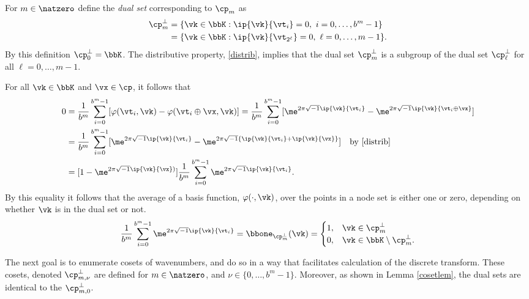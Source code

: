 \documentclass[]{elsarticle}
\theoremstyle{definition}
\begin{document}
For $m \in \natzero$ define the \emph{dual set} corresponding to $\cp_m$ as  
\begin{align*}
\cp^{\perp}_m &= \{\vk \in \bbK : \ip{\vk}{\vt_i} = 0, \ i=0, \ldots, b^m-1\} \\
&= \{\vk \in \bbK : \ip{\vk}{\vt_{2^{\ell}}} = 0, \ \ell=0, \ldots, m-1\}.
\end{align*}
By this definition $\cp^{\perp}_{0}=\bbK$.  The distributive property, \eqref{distrib}, implies that the dual set $\cp^{\perp}_m$ is a subgroup of the dual set $\cp^{\perp}_\ell$ for all $\ell=0, \ldots, m-1$.  

For all $\vk \in \bbK$ and $\vx \in \cp$, it follows that
\begin{align*} 
\nonumber
0 & = \frac{1}{b^m} \sum_{i=0}^{b^m-1} [\varphi(\vt_i,\vk) - \varphi(\vt_i \oplus \vx,\vk)]  
= \frac{1}{b^m} \sum_{i=0}^{b^m-1} [\me^{2 \pi \sqrt{-1} \ip{\vk}{\vt_i}} - \me^{2 \pi \sqrt{-1} \ip{\vk}{\vt_i \oplus \vx}}]\\
\nonumber
& = \frac{1}{b^m} \sum_{i=0}^{b^m-1} [\me^{2 \pi \sqrt{-1} \ip{\vk}{\vt_i}} - \me^{2 \pi \sqrt{-1} \{\ip{\vk}{\vt_i}+\ip{\vk}{\vx}\}}] \quad \text{by } \eqref{distrib}\\
\label{sumeq}
& = [1 - \me^{2 \pi \sqrt{-1} \ip{\vk}{\vx})}] \frac{1}{b^m} \sum_{i=0}^{b^m-1}  \me^{2 \pi \sqrt{-1} \ip{\vk}{\vt_i}}.
\end{align*}
By this equality it follows that the average of a basis function, $\varphi(\cdot,\vk)$, over the points in a node set is either one or zero, depending on whether $\vk$ is in the dual set or not.
\begin{equation*}
\frac{1}{b^m} \sum_{i=0}^{b^m-1}  \me^{2 \pi \sqrt{-1} \ip{\vk}{\vt_i}} = \bbone_{\cp_m^{\perp}}(\vk) = \begin{cases} 1 , & \vk \in \cp_m^{\perp}\\
 0,  & \vk \in \bbK \setminus \cp_m^{\perp}.
 \end{cases}
\end{equation*}

The next goal is to enumerate cosets of wavenumbers, and do so in a way that facilitates calculation of the discrete transform.  These cosets, denoted $\cp_{m,\nu}^{\perp}$ are defined for $m\in \natzero$, and $\nu \in \{0, \ldots, b^m-1\}$.  Moreover, as shown in Lemma \ref{cosetlem}, the dual sets are identical to the $\cp_{m,0}^{\perp}$.
\end{document}
